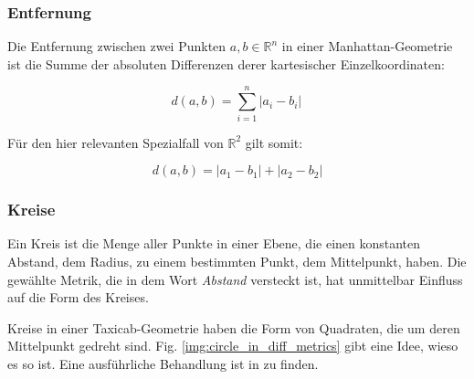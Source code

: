\documentclass{article}
\begin{document}
\subsubsection{Entfernung}

Die Entfernung zwischen zwei Punkten $a, b \in \mathbb{R}^n$ in einer Manhattan-Geometrie ist die Summe 
der absoluten Differenzen derer kartesischer Einzelkoordinaten:

\begin{equation*}
d(a,b)=\sum_{i=1}^n \left|a_i-b_i\right|\,
\end{equation*}

Für den hier relevanten Spezialfall von $\mathbb{R}^2$ gilt somit:

\begin{equation*}
d(a,b)=|a_1-b_1|+|a_2-b_2|
\end{equation*}

\subsubsection{Kreise}

Ein Kreis ist die Menge aller Punkte in einer Ebene, die einen konstanten Abstand, dem Radius, zu einem bestimmten
Punkt, dem Mittelpunkt, haben. Die gewählte Metrik, die in dem Wort \textit{Abstand} versteckt ist,
hat unmittelbar Einfluss auf die Form des Kreises.

Kreise in einer Taxicab-Geometrie haben die Form von Quadraten, die \unit[45]{\textdegree} um deren 
Mittelpunkt gedreht sind. Fig. \ref{img:circle_in_diff_metrics} gibt eine Idee, wieso es so ist. Eine 
ausführliche Behandlung ist in \cite{janssen2007} zu finden.
\end{document}
